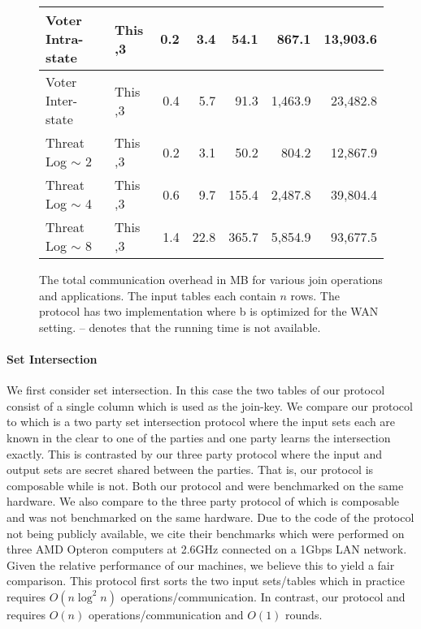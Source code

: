 \begin{figure*}[t!]
\begin{tabular}{|l |l|| r | r |r |r|r|}
		Voter Intra-state                 & This                           \hfill ,3        & 0.2   & 3.4      & 54.1     & 867.1    & 13,903.6 \\ \hline
		Voter Inter-state                 & This                           \hfill ,3        & 0.4   & 5.7      & 91.3     & 1,463.9  & 23,482.8 \\ \hline\hline
		Threat Log $\sim$ 2               & This                           \hfill ,3        & 0.2   & 3.1      & 50.2     & 804.2    & 12,867.9 \\ \hline
		Threat Log $\sim$ 4               & This                           \hfill ,3        & 0.6   & 9.7      & 155.4    & 2,487.8  & 39,804.4 \\ \hline
		Threat Log $\sim$ 8               & This                           \hfill ,3        & 1.4   & 22.8     & 365.7    & 5,854.9  & 93,677.5 \\ \hline
	\end{tabular}
\vspace{-0.3cm}
	\caption{\label{fig:comm}	The total communication overhead in MB for various join operations and applications. The input tables each contain $n$ rows. The  \cite{PSWW18} protocol has two implementation where  \cite{PSWW18}b is optimized for the WAN setting. -- denotes that the running time is not available. }
	\vspace{-0.2cm}
\end{figure*}




\paragraph{Set Intersection} We first consider set intersection. In this case the two tables of our protocol consist of a single column which is used as the join-key. We compare our protocol to \cite{CCS:KKRT16} which is a two party set intersection protocol where the input sets each are known in the clear to one of the parties and one party learns the intersection exactly. This is contrasted by our three party protocol where the input and output sets are secret shared between the parties. That is, our protocol is composable while \cite{CCS:KKRT16} is not. Both our protocol and \cite{CCS:KKRT16} were benchmarked on the same hardware. We also compare to the three party protocol of \cite{ASIACCS:BlaAgu12} which is composable and was not benchmarked on the same hardware. Due to the code of the \cite{ASIACCS:BlaAgu12} protocol not being publicly available, we cite their benchmarks which were performed on three AMD Opteron computers at 2.6GHz connected on a 1Gbps LAN network. Given the relative performance of our machines, we believe this to yield a fair comparison. This protocol first sorts the two input sets/tables which in practice requires $O(n\log^2 n)$ operations/communication\cite{ASIACCS:BlaAgu12}. In contrast, our protocol and \cite{CCS:KKRT16} requires $O(n)$ operations/communication and $O(1)$ rounds. 

